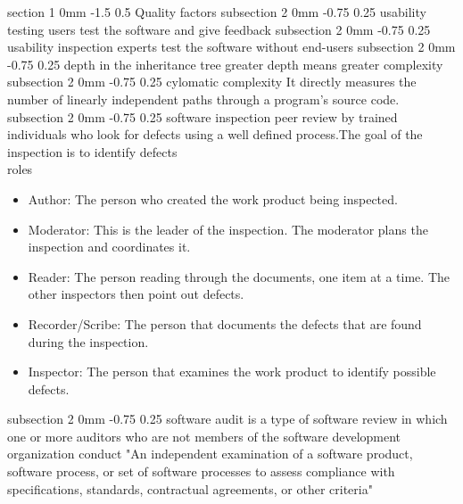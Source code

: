 \documentclass[a4paper,11pt]{article}
\makeatletter
\renewcommand{\section}{\@startsection
   {section}%
   {1}%
   {0mm}%
   {-1.5\baselineskip}%
   {0.5\baselineskip}%
   {\sffamily\bfseries\upshape\normalsize}}%
\renewcommand{\subsection}{\@startsection
   {subsection}%
   {2}%
   {0mm}%
   {-0.75\baselineskip}%
   {0.25\baselineskip}%
   {\rmfamily\normalfont\slshape\normalsize}}%
\makeatother
\begin{document}
\section{Quality factors}
\subsection{usability testing}
users test the software and give feedback
\subsection{usability inspection}
experts test the software without end-users
\subsection{depth in the inheritance tree}
greater depth means greater complexity
\subsection{cylomatic complexity}
It directly measures the number of linearly independent paths through a program's source code.
\subsection{software inspection}
peer review by trained individuals who look for defects using a well defined process.The goal of the inspection is to identify defects
\\roles
\begin{itemize}
\item Author: The person who created the work product being inspected.
\item Moderator: This is the leader of the inspection. The moderator plans the inspection and coordinates it.
\item Reader: The person reading through the documents, one item at a time. The other inspectors then point out defects.
\item Recorder/Scribe: The person that documents the defects that are found during the inspection.
\item Inspector: The person that examines the work product to identify possible defects.

\end{itemize}
\subsection{software audit}
is a type of software review in which one or more auditors who are not members of the software development organization conduct "An independent examination of a software product, software process, or set of software processes to assess compliance with specifications, standards, contractual agreements, or other criteria"
\end{document}
